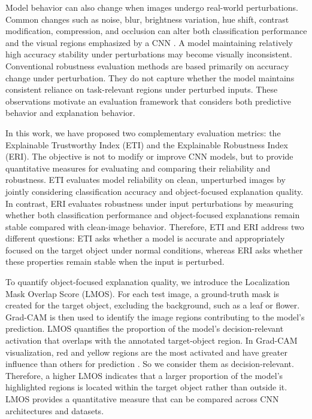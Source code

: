 \documentclass[a4paper,fleqn]{cas-dc}
\begin{document}
Model behavior can also change when images undergo real-world perturbations. Common changes such as noise, blur, brightness variation, hue shift, contrast modification, compression, and occlusion can alter both classification performance and the visual regions emphasized by a CNN \cite{r5,r9}. A model maintaining relatively high accuracy stability under perturbations may become visually inconsistent. Conventional robustness evaluation methods are based primarily on accuracy change under perturbation. They do not capture whether the model maintains consistent reliance on task-relevant regions under perturbed inputs. These observations motivate an evaluation framework that considers both predictive behavior and explanation behavior.

In this work, we have proposed two complementary evaluation metrics: the Explainable Trustworthy Index (ETI) and the Explainable Robustness Index (ERI). The objective is not to modify or improve CNN models, but to provide quantitative measures for evaluating and comparing their reliability and robustness. ETI evaluates model reliability on clean, unperturbed images by jointly considering classification accuracy and object-focused explanation quality. In contrast, ERI evaluates robustness under input perturbations by measuring whether both classification performance and object-focused explanations remain stable compared with clean-image behavior. Therefore, ETI and ERI address two different questions: ETI asks whether a model is accurate and appropriately focused on the target object under normal conditions, whereas ERI asks whether these properties remain stable when the input is perturbed.

To quantify object-focused explanation quality, we introduce the Localization Mask Overlap Score (LMOS). For each test image, a ground-truth mask is created for the target object, excluding the background, such as a leaf or flower. Grad-CAM is then used to identify the image regions contributing to the model's prediction. LMOS quantifies the proportion of the model's decision-relevant activation that overlaps with the annotated target-object region. In Grad-CAM visualization, red and yellow regions are the most activated and have greater influence than others for prediction \cite{r9.1}\cite{r9.2}. So we consider them as decision-relevant. Therefore, a higher LMOS indicates that a larger proportion of the model's highlighted regions is located within the target object rather than outside it. LMOS provides a quantitative measure that can be compared across CNN architectures and datasets.
\end{document}
